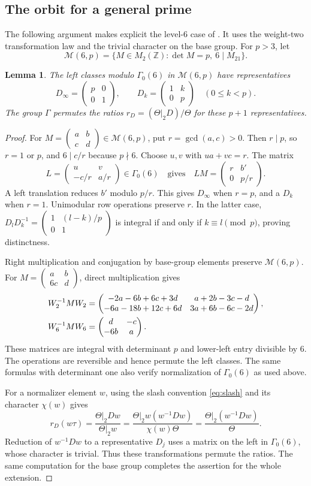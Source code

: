 \documentclass[11pt,a4paper]{article}
\newtheorem{lemma}[theorem]{Lemma}
\theoremstyle{remark}
\newcommand{\Z}{\mathbb Z}\newcommand{\Q}{\mathbb Q}
\newcommand{\smat}[4]{\begin{pmatrix}#1&#2\\#3&#4\end{pmatrix}}
\begin{document}
\subsection{The orbit for a general prime}
The following argument makes explicit the level-$6$ case of
\cite[Lemma~3.7]{beukers}. It uses the weight-two transformation law
and the trivial character on the base group.
For $p>3$, let
\[
 \mathcal M(6,p)=\{M\in M_2(\Z):\det M=p,\ 6\mid M_{21}\}.
\]
\begin{lemma}\label{lem:orbit}
The left classes modulo $\Gamma_0(6)$ in $\mathcal M(6,p)$ have representatives
\begin{equation}\label{eq:Hecke-representatives}
 D_\infty=\smat p001,\qquad
 D_k=\smat1k0p\quad(0\le k<p).
\end{equation}
The group $\Gamma$ permutes the ratios
$r_D=(\Theta|_2D)/\Theta$ for these $p+1$ representatives.
\end{lemma}
\begin{proof}
For $M=\smat abcd\in\mathcal M(6,p)$, put $r=\gcd(a,c)>0$.
Then $r\mid p$, so $r=1$ or $p$, and $6\mid c/r$ because $p\nmid6$.
Choose $u,v$ with $ua+vc=r$. The matrix
\[
 L=\smat uv{-c/r}{a/r}\in\Gamma_0(6)
 \quad\text{gives}\quad
 LM=\smat r{b'}0{p/r}.
\]
A left translation reduces $b'$ modulo $p/r$.
This gives $D_\infty$ when $r=p$, and a $D_k$ when $r=1$.
Unimodular row operations preserve $r$. In the latter case,
$D_lD_k^{-1}=\smat1{(l-k)/p}01$ is integral if and only if
$k\equiv l\pmod p$, proving distinctness.

Right multiplication and conjugation by base-group elements preserve
$\mathcal M(6,p)$. For $M=\smat ab{6c}d$, direct multiplication gives
\begin{align}\label{eq:Hecke-conjugations}
 W_2^{-1}MW_2
 &=\begin{pmatrix}
 -2a-6b+6c+3d&a+2b-3c-d\\
 -6a-18b+12c+6d&3a+6b-6c-2d
 \end{pmatrix},\notag\\
 W_6^{-1}MW_6&=\smat d{-c}{-6b}a.
\end{align}
These matrices are integral with determinant $p$ and lower-left
entry divisible by $6$. The operations are reversible and hence
permute the left classes. The same formulas with determinant one
also verify normalization of $\Gamma_0(6)$ as used above.

For a normalizer element $w$, using the slash convention
\eqref{eq:slash} and its character $\chi(w)$ gives
\[
 r_D(w\tau)
 =\frac{\Theta|_2Dw}{\Theta|_2w}
 =\frac{\Theta|_2w(w^{-1}Dw)}{\chi(w)\Theta}
 =\frac{\Theta|_2(w^{-1}Dw)}{\Theta}.
\]
Reduction of $w^{-1}Dw$ to a representative $D_j$ uses a matrix
on the left in $\Gamma_0(6)$, whose character is trivial.
Thus these transformations permute the ratios.
The same computation for the base group completes the assertion
for the whole extension.
\end{proof}
\end{document}
